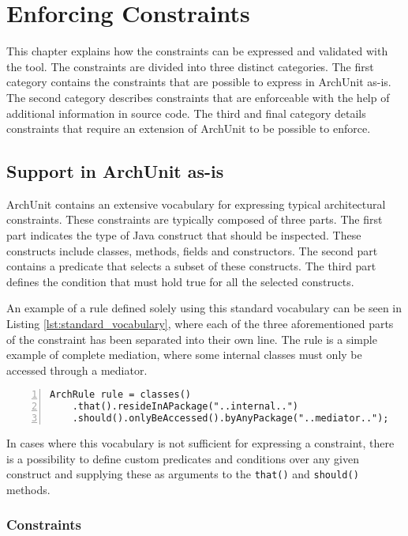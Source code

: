\chapter{Enforcing Constraints}

This chapter explains how the constraints can be expressed and validated with the tool. The constraints are divided into three distinct categories. The first category contains the constraints that are possible to express in ArchUnit as-is. The second category describes constraints that are enforceable with the help of additional information in source code. The third and final category details constraints that require an extension of ArchUnit to be possible to enforce.

\section{Support in ArchUnit as-is}

ArchUnit contains an extensive vocabulary for expressing typical architectural constraints. These constraints are typically composed of three parts. The first part indicates the type of Java construct that should be inspected. These constructs include classes, methods, fields and constructors. The second part contains a predicate that selects a subset of these constructs. The third part defines the condition that must hold true for all the selected constructs.

An example of a rule defined solely using this standard vocabulary can be seen in Listing \ref{lst:standard_vocabulary}, where each of the three aforementioned parts of the constraint has been separated into their own line. The rule is a simple example of complete mediation, where some internal classes must only be accessed through a mediator.

\begin{lstlisting}[caption={Example of a rule that is expressed with the standard vocabulary.}, captionpos=b, label=lst:standard_vocabulary, numbers=left]
ArchRule rule = classes()
    .that().resideInAPackage("..internal..")
    .should().onlyBeAccessed().byAnyPackage("..mediator..");
\end{lstlisting}

In cases where this vocabulary is not sufficient for expressing a constraint, there is a possibility to define custom predicates and conditions over any given construct and supplying these as arguments to the \texttt{that()} and \texttt{should()} methods.

\subsection{Constraints}

